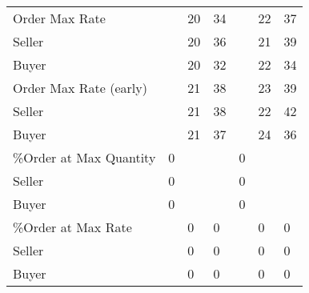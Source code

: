 \begin{tabular}{lllllll}
 Order Max Rate           &          & 20            & 34            &           & 22            & 37            \\
 Seller                   &          & 20            & 36            &           & 21            & 39            \\
 Buyer                    &          & 20            & 32            &           & 22            & 34            \\
 Order Max Rate (early)   &          & 21            & 38            &           & 23            & 39            \\
 Seller                   &          & 21            & 38            &           & 22            & 42            \\
 Buyer                    &          & 21            & 37            &           & 24            & 36            \\
 \%Order at Max Quantity   & 0        &               &               & 0         &               &               \\
 Seller                   & 0        &               &               & 0         &               &               \\
 Buyer                    & 0        &               &               & 0         &               &               \\
 \%Order at Max Rate       &          & 0             & 0             &           & 0             & 0             \\
 Seller                   &          & 0             & 0             &           & 0             & 0             \\
 Buyer                    &          & 0             & 0             &           & 0             & 0             \\
\hline
\end{tabular}